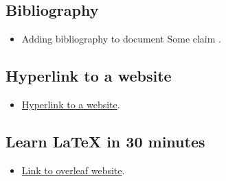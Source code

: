 \subsection{Bibliography}
\begin{itemize}
    \item Adding bibliography to document
Some claim \cite{gratzer2007more}.
\end{itemize}

\subsection{Hyperlink to a website}
\begin{itemize}
    \item \href{https://www.overleaf.com/latex/templates/a-quick-guide-to-latex/fghqpfgnxggz}{Hyperlink to a website}.
\end{itemize}



\subsection{Learn LaTeX in 30 minutes}
\begin{itemize}
    \item \href{https://www.overleaf.com/learn/latex/Learn_LaTeX_in_30_minutes}{Link to overleaf website}.
\end{itemize}


